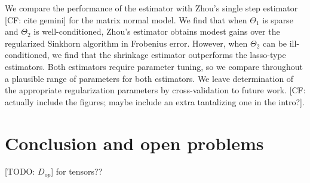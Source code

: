 \documentclass[aos]{imsart}
\theoremstyle{definition}
\numberwithin{equation}{section}
\newcommand{\CF}[1]{{\color{purple}[CF: #1]}}
\newcommand{\TODO}[1]{{\color{blue}[TODO: #1]}}
\begin{document}
We compare the performance of the estimator with Zhou's single step estimator \CF{cite gemini} for the matrix normal model. We find that when $\Theta_1$ is sparse and $\Theta_2$ is well-conditioned, Zhou's estimator obtains modest gains over the regularized Sinkhorn algorithm in Frobenius error. However, when $\Theta_2$ can be ill-conditioned, we find that the shrinkage estimator outperforms the lasso-type estimators. Both estimators require parameter tuning, so we compare throughout a plausible range of parameters for both estimators. We leave determination of the appropriate regularization parameters by cross-validation to future work. \CF{actually include the figures; maybe include an extra tantalizing one in the intro?}.






\section{Conclusion and open problems}
\TODO{$D_{op}$} for tensors??
\end{document}
